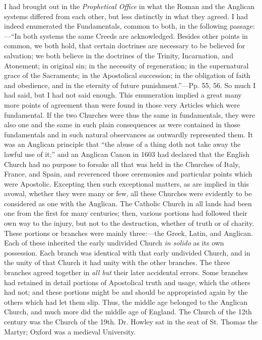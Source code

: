 I had brought out in the \emph{Prophetical Office} in what the
Roman and the Anglican systems differed from each other, but less
distinctly in what they agreed. I had indeed enumerated the
Fundamentals, common to both, in the following passage:—``In both
systems the same Creeds are acknowledged. Besides other points in common,
we both hold, that certain doctrines are necessary to be believed for
salvation; we both believe in the doctrines of the Trinity, Incarnation,
and Atonement; in original sin; in the necessity of regeneration; in the
supernatural grace of the Sacraments; in the Apostolical succession; in
the obligation of faith and obedience, and in the eternity of future
punishment.''—Pp. 55, 56. So much I had said, but I had not said
enough. This enumeration implied a great many more points of agreement
than were found in those very Articles which were fundamental. If the
two Churches were thus the same in fundamentals, they were also one and
the same in such plain consequences as were contained in those
fundamentals and in such natural observances as outwardly represented them. It was an
Anglican principle that ``the abuse of a thing doth not take away
the lawful use of it;'' and an Anglican Canon in 1603 had declared
that the English Church had no purpose to forsake all that was held in
the Churches of Italy, France, and Spain, and reverenced those
ceremonies and particular points which were Apostolic. Excepting then
such exceptional matters, as are implied in this avowal, whether they
were many or few, all these Churches were evidently to be considered as
one with the Anglican. The Catholic Church in all lands had been one
from the first for many centuries; then, various portions had followed
their own way to the injury, but not to the destruction, whether of
truth or of charity. These portions or branches were mainly three:—the
Greek, Latin, and Anglican. Each of these inherited the early undivided
Church \emph{in solido} as its own possession. Each branch was identical
with that early undivided Church, and in the unity of that Church it had
unity with the other branches. The three branches agreed together in \emph{all
but} their later accidental errors. Some branches had retained in
detail portions of Apostolical truth and usage, which the others had
not; and these portions might be and should be appropriated again by the
others which had let them slip. Thus, the middle age belonged to
the Anglican Church, and much more did the middle age of England. The
Church of the 12th century was the Church of the 19th. Dr. Howley sat in
the seat of St. Thomas the Martyr; Oxford was a medieval University.

